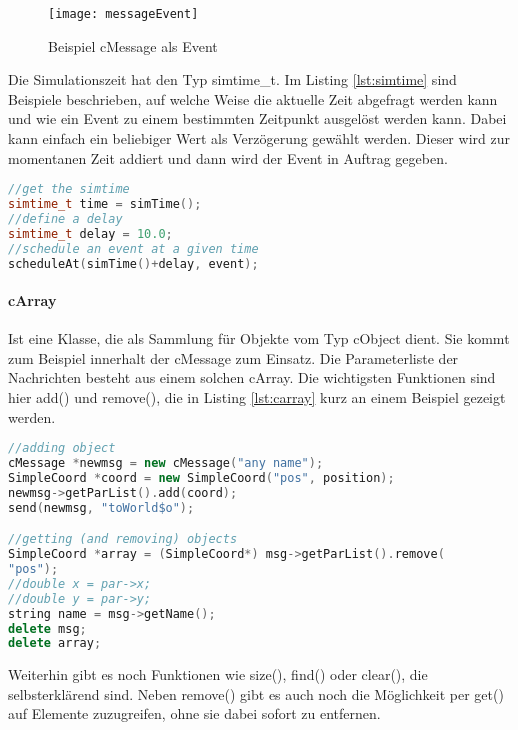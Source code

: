 \begin{figure}[htbp]
\centering
\caption{Beispiel cMessage als Event}
\label{fig:messageEvent}
\texttt{[image: messageEvent]}
\end{figure}

Die Simulationszeit hat den Typ simtime\_t. Im Listing \ref{lst:simtime} sind Beispiele beschrieben, auf welche Weise die aktuelle Zeit abgefragt werden kann und wie ein Event zu einem bestimmten Zeitpunkt ausgelöst werden kann. Dabei kann einfach ein beliebiger Wert als Verzögerung gewählt werden. Dieser wird zur momentanen Zeit addiert und dann wird der Event in Auftrag gegeben.

\begin{minipage}{\textwidth}
\begin{lstlisting}[language=C++,caption={Simulationszeit und Event},label=lst:simtime]
//get the simtime
simtime_t time = simTime();
//define a delay
simtime_t delay = 10.0;
//schedule an event at a given time
scheduleAt(simTime()+delay, event);
\end{lstlisting}
\end{minipage}

\paragraph{cArray} Ist eine Klasse, die als Sammlung für Objekte vom Typ cObject dient. Sie kommt zum Beispiel innerhalt der cMessage zum Einsatz. Die Parameterliste der Nachrichten besteht aus einem solchen cArray. Die wichtigsten Funktionen sind hier add() und remove(), die in Listing \ref{lst:carray} kurz an einem Beispiel gezeigt werden.

\begin{minipage}{\textwidth}
\begin{lstlisting}[language=C++,caption={cArray add und remove},label=lst:carray]
//adding object
cMessage *newmsg = new cMessage("any name");
SimpleCoord *coord = new SimpleCoord("pos", position);
newmsg->getParList().add(coord);
send(newmsg, "toWorld$o");

//getting (and removing) objects
SimpleCoord *array = (SimpleCoord*) msg->getParList().remove(
"pos");
//double x = par->x;
//double y = par->y;
string name = msg->getName();
delete msg;
delete array;

\end{lstlisting}
\end{minipage}

Weiterhin gibt es noch Funktionen wie size(), find() oder clear(), die selbsterklärend sind. Neben remove() gibt es auch noch die Möglichkeit per get() auf Elemente zuzugreifen, ohne sie dabei sofort zu entfernen.

